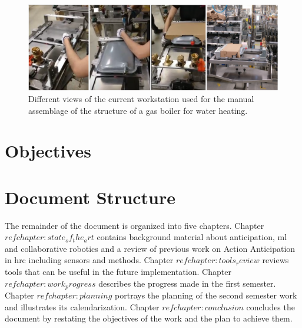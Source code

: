 \begin{figure}[H]
\centerline{\includegraphics[width=6in]{figs/usecase.png}}
\caption{Different views of the current workstation used for the manual assemblage of the structure of a gas boiler for water heating.}
\label{fig:usecase}
\end{figure}

\section{Objectives}

\section{Document Structure}

The remainder of the document is organized into five chapters. Chapter $ref{chapter:state_of_the_art}$ contains background material about anticipation, \acl{ml} and collaborative robotics and a review of previous work on Action Anticipation in \acs{hrc} including sensors and methods. Chapter $ref{chapter:tools_review}$ reviews tools that can be useful in the future implementation. Chapter $ref{chapter:work_progress}$ describes the progress made in the first semester. Chapter $ref{chapter:planning}$ portrays the planning of the second semester work and illustrates its calendarization. Chapter $ref{chapter:conclusion}$ concludes the document by restating the objectives of the work and the plan to achieve them.

